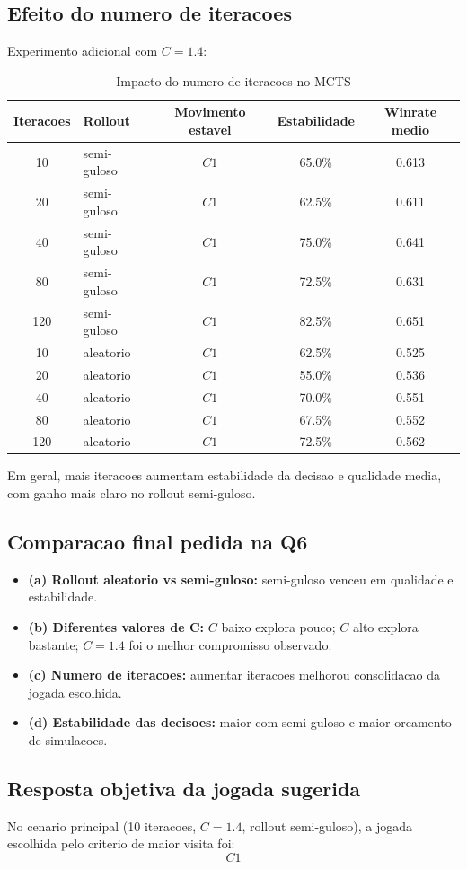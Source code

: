 \subsection{Efeito do numero de iteracoes}
Experimento adicional com $C=1.4$:
\begingroup
\footnotesize
\setlength{\tabcolsep}{4pt}
\begin{table}[H]
\centering
\begin{tabular}{c p{2.3cm} c c c}
\toprule
Iteracoes & Rollout & Movimento estavel & Estabilidade & Winrate medio \\
\midrule
10 & semi-guloso & $C1$ & 65.0\% & 0.613 \\
20 & semi-guloso & $C1$ & 62.5\% & 0.611 \\
40 & semi-guloso & $C1$ & 75.0\% & 0.641 \\
80 & semi-guloso & $C1$ & 72.5\% & 0.631 \\
120 & semi-guloso & $C1$ & 82.5\% & 0.651 \\
\midrule
10 & aleatorio & $C1$ & 62.5\% & 0.525 \\
20 & aleatorio & $C1$ & 55.0\% & 0.536 \\
40 & aleatorio & $C1$ & 70.0\% & 0.551 \\
80 & aleatorio & $C1$ & 67.5\% & 0.552 \\
120 & aleatorio & $C1$ & 72.5\% & 0.562 \\
\bottomrule
\end{tabular}
\caption{Impacto do numero de iteracoes no MCTS}
\end{table}
\endgroup

Em geral, mais iteracoes aumentam estabilidade da decisao e qualidade media, com ganho mais claro no rollout semi-guloso.

\subsection{Comparacao final pedida na Q6}
\begin{itemize}[leftmargin=1.5em]
  \item \textbf{(a) Rollout aleatorio vs semi-guloso:} semi-guloso venceu em qualidade e estabilidade.
  \item \textbf{(b) Diferentes valores de C:} $C$ baixo explora pouco; $C$ alto explora bastante; $C=1.4$ foi o melhor compromisso observado.
  \item \textbf{(c) Numero de iteracoes:} aumentar iteracoes melhorou consolidacao da jogada escolhida.
  \item \textbf{(d) Estabilidade das decisoes:} maior com semi-guloso e maior orcamento de simulacoes.
\end{itemize}

\subsection{Resposta objetiva da jogada sugerida}
No cenario principal (10 iteracoes, $C=1.4$, rollout semi-guloso), a jogada escolhida pelo criterio de maior visita foi:
\[
\boxed{C1}
\]
